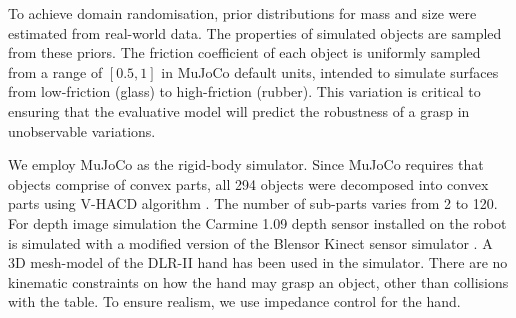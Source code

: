 To achieve domain randomisation, prior distributions for mass and size were estimated from real-world data. The properties of simulated objects are sampled from these priors. The friction coefficient of each object is uniformly sampled from a range of $[0.5, 1]$ in MuJoCo default units, intended to simulate surfaces from low-friction (glass) to high-friction (rubber). This variation is critical to ensuring that the evaluative model will predict the robustness of a grasp in unobservable variations.


We employ MuJoCo \cite{MuJoCo} as the rigid-body simulator. Since MuJoCo requires that objects comprise of convex parts, all 294 objects were decomposed into convex parts using V-HACD algorithm \cite{V-HACD}. The number of sub-parts varies from 2 to 120. For depth image simulation the Carmine 1.09 depth sensor installed on the robot is simulated with a modified version of the Blensor Kinect sensor simulator \cite{KinectSimulator}. A 3D mesh-model of the DLR-II hand has been used in the simulator. There are no kinematic constraints on how the hand may grasp an object, other than collisions with the table. To ensure realism, we use impedance control for the hand.




